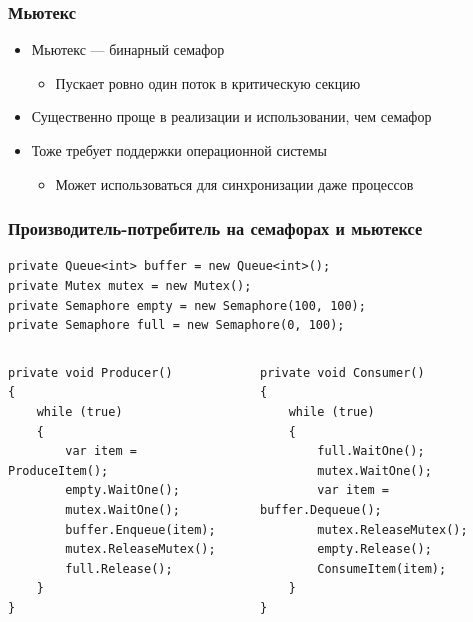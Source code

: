 \documentclass[xetex,mathserif,serif]{beamer}
\begin{document}
	\begin{frame}
		\frametitle{Мьютекс}
		\begin{itemize}
			\item Мьютекс --- бинарный семафор
			\begin{itemize}
				\item Пускает ровно один поток в критическую секцию
			\end{itemize}
			\item Существенно проще в реализации и использовании, чем семафор
			\item Тоже требует поддержки операционной системы
			\begin{itemize}
				\item Может использоваться для синхронизации даже процессов
			\end{itemize}
		\end{itemize}
	\end{frame}

	\begin{frame}[fragile]
		\frametitle{Производитель-потребитель на семафорах и мьютексе}
		\begin{footnotesize}
			\begin{verbatim}
private Queue<int> buffer = new Queue<int>();
private Mutex mutex = new Mutex();
private Semaphore empty = new Semaphore(100, 100);
private Semaphore full = new Semaphore(0, 100);
			\end{verbatim}
			\begin{columns}
				\begin{column}{0.5\textwidth}
					\begin{verbatim}
private void Producer()
{
    while (true)
    {
        var item = ProduceItem();
        empty.WaitOne();
        mutex.WaitOne();
        buffer.Enqueue(item);
        mutex.ReleaseMutex();
        full.Release();
    }
}
					\end{verbatim}
				\end{column}
				\begin{column}{0.5\textwidth}
					\begin{verbatim}
private void Consumer()
{
    while (true)
    {
        full.WaitOne();
        mutex.WaitOne();
        var item = buffer.Dequeue();
        mutex.ReleaseMutex();
        empty.Release();
        ConsumeItem(item);
    }
}
					\end{verbatim}
				\end{column}
			\end{columns}
		\end{footnotesize}
	\end{frame}
\end{document}
